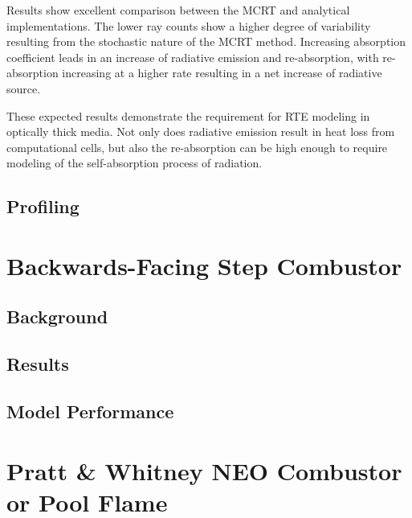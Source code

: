 Results show excellent comparison between the MCRT and analytical implementations. 
The lower ray counts show a higher degree of variability resulting from the stochastic nature of the MCRT method. 
Increasing absorption coefficient leads in an increase of radiative emission and re-absorption, with re-absorption increasing at a higher rate resulting in a net increase of radiative source.

These expected results demonstrate the requirement for RTE modeling in optically thick media. Not only does radiative emission result in heat loss from computational cells, but also the re-absorption can be high enough to require modeling of the self-absorption process of radiation.

\subsection{Profiling}


\section{Backwards-Facing Step Combustor}
\subsection{Background}
\subsection{Results}
\subsection{Model Performance}
\section{Pratt \& Whitney NEO Combustor or Pool Flame}